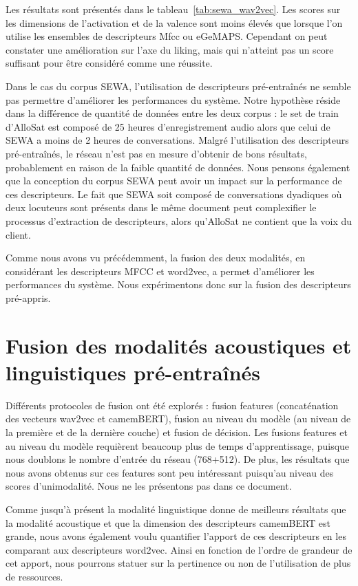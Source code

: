 

Les résultats sont présentés dans le tableau~\ref{tab:sewa_wav2vec}. Les scores sur les dimensions de l'activation et de la valence sont moins élevés que lorsque l'on utilise les ensembles de descripteurs Mfcc ou eGeMAPS. Cependant on peut constater une amélioration sur l'axe du liking, mais qui n'atteint pas un score suffisant pour être considéré comme une réussite.

Dans le cas du corpus SEWA, l'utilisation de descripteurs pré-entraînés ne semble pas permettre d'améliorer les performances du système. Notre hypothèse réside dans la différence de quantité de données entre les deux corpus : le set de train d'AlloSat est composé de 25 heures d'enregistrement audio alors que celui de SEWA a moins de 2 heures de conversations. Malgré l'utilisation des descripteurs pré-entraînés, le réseau n'est pas en mesure d'obtenir de bons résultats, probablement en raison de la faible quantité de données. Nous pensons également que la conception du corpus SEWA peut avoir un impact sur la performance de ces descripteurs. Le fait que SEWA soit composé de conversations dyadiques où deux locuteurs sont présents dans le même document peut complexifier le processus d'extraction de descripteurs, alors qu'AlloSat ne contient que la voix du client.


Comme nous avons vu précédemment, la fusion des deux modalités, en considérant les descripteurs MFCC et word2vec, a permet d'améliorer les performances du système. Nous expérimentons donc sur la fusion des descripteurs pré-appris.

\section{Fusion des modalités acoustiques et linguistiques pré-entraînés}
Différents protocoles de fusion ont été explorés : fusion features (concaténation des vecteurs wav2vec et camemBERT), fusion au niveau du modèle (au niveau de la première et de la dernière couche) et fusion de décision. Les fusions features et au niveau du modèle requièrent beaucoup plus de temps d'apprentissage, puisque nous doublons le nombre d'entrée du réseau (768+512). De plus, les résultats que nous avons obtenus sur ces features sont peu intéressant puisqu'au niveau des scores d'unimodalité. Nous ne les présentons pas dans ce document.

Comme jusqu'à présent la modalité linguistique donne de meilleurs résultats que la modalité acoustique et que la dimension des descripteurs camemBERT est grande, nous avons également voulu quantifier l'apport de ces descripteurs en les comparant aux descripteurs word2vec. Ainsi en fonction de l'ordre de grandeur de cet apport, nous pourrons statuer sur la pertinence ou non de l'utilisation de plus de ressources.

